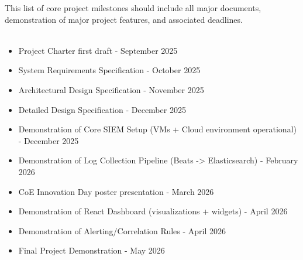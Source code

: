 This list of core project milestones should include all major documents, demonstration of major project features, and associated deadlines. 
\\
\\
\begin{itemize}
  \item Project Charter first draft - September 2025
  \item System Requirements Specification - October 2025
  \item Architectural Design Specification - November 2025
  \item Detailed Design Specification - December 2025
  \item Demonstration of Core SIEM Setup (VMs + Cloud environment operational) - December 2025
  \item Demonstration of Log Collection Pipeline (Beats -> Elasticsearch) - February 2026
  \item CoE Innovation Day poster presentation - March 2026
  \item Demonstration of React Dashboard (visualizations + widgets) - April 2026
  \item Demonstration of Alerting/Correlation Rules - April 2026
  \item Final Project Demonstration - May 2026
\end{itemize}
